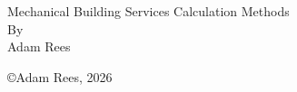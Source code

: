 \begin{titlepage}
\begin{center}
\thispagestyle{plain}
 \setcounter{page}{1}

\begin{doublespace}

\vspace*{\fill}
\LARGE
Mechanical Building Services Calculation Methods\\
\vspace{1.5cm}
By\\Adam Rees
\end{doublespace}

\vfill
\large
\copyright Adam Rees, 2026

\end{center}
\end{titlepage}